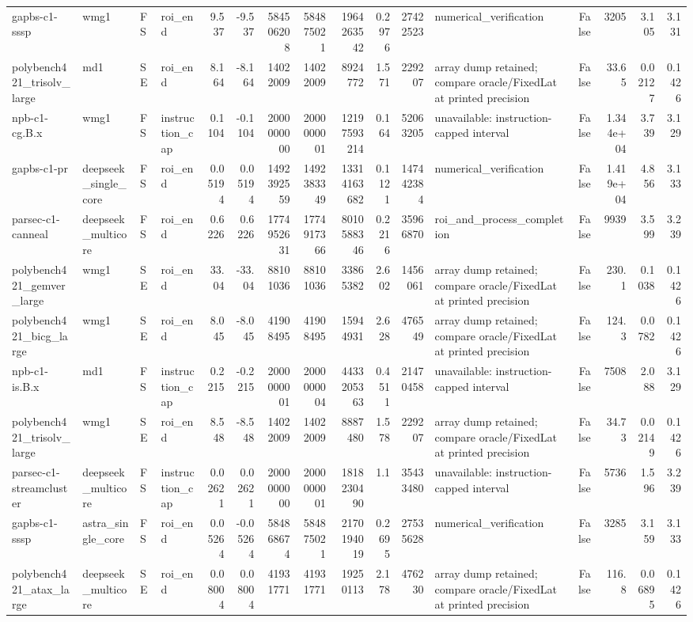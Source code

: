 \begin{tabular}{llllrrrrrrrlrrrr}
gapbs-c1-sssp & wmg1 & FS & roi\_end & 9.537 & -9.537 & 584506208 & 584875021 & 1964263542 & 0.2976 & 27422523 & numerical\_verification & False & 3205 & 3.105 & 3.131 \\
polybench421\_trisolv\_large & md1 & SE & roi\_end & 8.164 & -8.164 & 14022009 & 14022009 & 8924772 & 1.571 & 229207 & array dump retained; compare oracle/FixedLat at printed precision & False & 33.65 & 0.02127 & 0.1426 \\
npb-c1-cg.B.x & wmg1 & FS & instruction\_cap & 0.1104 & -0.1104 & 2000000000 & 2000000001 & 12197593214 & 0.164 & 52063205 & unavailable: instruction-capped interval & False & 1.344e+04 & 3.739 & 3.129 \\
gapbs-c1-pr & deepseek\_single\_core & FS & roi\_end & 0.05194 & 0.05194 & 1492392559 & 1492383349 & 13314163682 & 0.1121 & 147442384 & numerical\_verification & False & 1.419e+04 & 4.856 & 3.133 \\
parsec-c1-canneal & deepseek\_multicore & FS & roi\_end & 0.6226 & 0.6226 & 1774952631 & 1774917366 & 8010588346 & 0.2216 & 35966870 & roi\_and\_process\_completion & False & 9939 & 3.599 & 3.239 \\
polybench421\_gemver\_large & wmg1 & SE & roi\_end & 33.04 & -33.04 & 88101036 & 88101036 & 33865382 & 2.602 & 1456061 & array dump retained; compare oracle/FixedLat at printed precision & False & 230.1 & 0.1038 & 0.1426 \\
polybench421\_bicg\_large & wmg1 & SE & roi\_end & 8.045 & -8.045 & 41908495 & 41908495 & 15944931 & 2.628 & 476549 & array dump retained; compare oracle/FixedLat at printed precision & False & 124.3 & 0.0782 & 0.1426 \\
npb-c1-is.B.x & md1 & FS & instruction\_cap & 0.2215 & -0.2215 & 2000000001 & 2000000004 & 4433205363 & 0.4511 & 21470458 & unavailable: instruction-capped interval & False & 7508 & 2.088 & 3.129 \\
polybench421\_trisolv\_large & wmg1 & SE & roi\_end & 8.548 & -8.548 & 14022009 & 14022009 & 8887480 & 1.578 & 229207 & array dump retained; compare oracle/FixedLat at printed precision & False & 34.73 & 0.02149 & 0.1426 \\
parsec-c1-streamcluster & deepseek\_multicore & FS & instruction\_cap & 0.02621 & 0.02621 & 2000000000 & 2000000001 & 1818230490 & 1.1 & 35433480 & unavailable: instruction-capped interval & False & 5736 & 1.596 & 3.239 \\
gapbs-c1-sssp & astra\_single\_core & FS & roi\_end & 0.05264 & -0.05264 & 584868674 & 584875021 & 2170194019 & 0.2695 & 27535628 & numerical\_verification & False & 3285 & 3.159 & 3.133 \\
polybench421\_atax\_large & deepseek\_multicore & SE & roi\_end & 0.08004 & 0.08004 & 41931771 & 41931771 & 19250113 & 2.178 & 476230 & array dump retained; compare oracle/FixedLat at printed precision & False & 116.8 & 0.06895 & 0.1426 \\
\bottomrule
\end{tabular}

